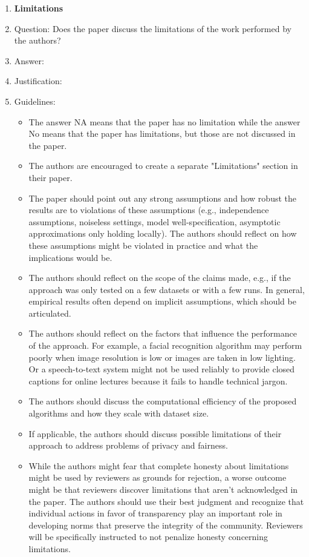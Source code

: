 \documentclass{article}
\begin{document}
\begin{enumerate}
\item {\bf Limitations}
    \item[] Question: Does the paper discuss the limitations of the work performed by the authors?
    \item[] Answer: \answerTODO{} %
    \item[] Justification: \justificationTODO{}
    \item[] Guidelines:
    \begin{itemize}
        \item The answer NA means that the paper has no limitation while the answer No means that the paper has limitations, but those are not discussed in the paper. 
        \item The authors are encouraged to create a separate "Limitations" section in their paper.
        \item The paper should point out any strong assumptions and how robust the results are to violations of these assumptions (e.g., independence assumptions, noiseless settings, model well-specification, asymptotic approximations only holding locally). The authors should reflect on how these assumptions might be violated in practice and what the implications would be.
        \item The authors should reflect on the scope of the claims made, e.g., if the approach was only tested on a few datasets or with a few runs. In general, empirical results often depend on implicit assumptions, which should be articulated.
        \item The authors should reflect on the factors that influence the performance of the approach. For example, a facial recognition algorithm may perform poorly when image resolution is low or images are taken in low lighting. Or a speech-to-text system might not be used reliably to provide closed captions for online lectures because it fails to handle technical jargon.
        \item The authors should discuss the computational efficiency of the proposed algorithms and how they scale with dataset size.
        \item If applicable, the authors should discuss possible limitations of their approach to address problems of privacy and fairness.
        \item While the authors might fear that complete honesty about limitations might be used by reviewers as grounds for rejection, a worse outcome might be that reviewers discover limitations that aren't acknowledged in the paper. The authors should use their best judgment and recognize that individual actions in favor of transparency play an important role in developing norms that preserve the integrity of the community. Reviewers will be specifically instructed to not penalize honesty concerning limitations.
    \end{itemize}


\end{enumerate}
\end{document}
